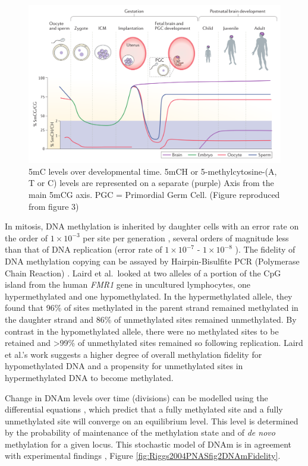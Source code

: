 \documentclass[]{book}
\begin{document}
\begin{figure}

{\centering \includegraphics[width=0.8\linewidth]{figs/Ciernia2016f3DNAmTime} 

}

\caption{5mC levels over developmental time. 5mCH or 5-methylcytosine-(A, T or C) levels are represented on a separate (purple) Axis from the main 5mCG axis. PGC = Primordial Germ Cell. (Figure reproduced from \citet{Ciernia2016} figure 3)}\label{fig:DNAmDevTime}
\end{figure}



In mitosis, DNA methylation is inherited by daughter cells with an error rate on the order of \(1\times10^{-3}\) per site per generation \citep{Ushijima2005}, several orders of magnitude less than that of DNA replication (error rate of \(1\times10^{-7}\) - \(1\times10^{-8}\) \citep{Kunkel2004a}). The fidelity of DNA methylation copying can be assayed by Hairpin-Bisulfite PCR (Polymerase Chain Reaction) \citep{Laird2004}. Laird et al.~looked at two alleles of a portion of the CpG island from the human \emph{FMR1} gene in uncultured lymphocytes, one hypermethylated and one hypomethylated. In the hypermethylated allele, they found that 96\% of sites methylated in the parent strand remained methylated in the daughter strand and 86\% of unmethylated sites remained unmethylated. By contrast in the hypomethylated allele, there were no methylated sites to be retained and \textgreater99\% of unmethylated sites remained so following replication. Laird et al.'s work suggests a higher degree of overall methylation fidelity for hypomethylated DNA and a propensity for unmethylated sites in hypermethylated DNA to become methylated.

Change in DNAm levels over time (divisions) can be modelled using the differential equations \citep{Pfeifer1990a}, which predict that a fully methylated site and a fully unmethylated site will converge on an equilibrium level. This level is determined by the probability of maintenance of the methylation state and of \emph{de novo} methylation for a given locus. This stochastic model of DNAm is in agreement with experimental findings \citep[\citet{Riggs2004a}]{Laird2004}, Figure \ref{fig:Riggs2004PNASfig2DNAmFidelity}.
\end{document}
